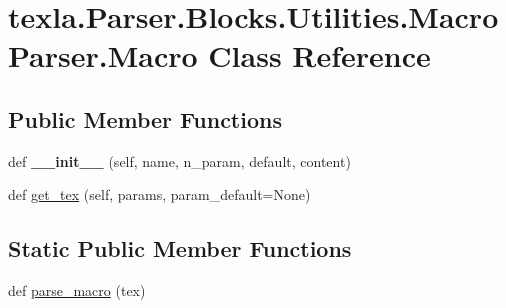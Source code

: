 \hypertarget{classtexla_1_1Parser_1_1Blocks_1_1Utilities_1_1MacroParser_1_1Macro}{}\section{texla.\+Parser.\+Blocks.\+Utilities.\+Macro\+Parser.\+Macro Class Reference}
\label{classtexla_1_1Parser_1_1Blocks_1_1Utilities_1_1MacroParser_1_1Macro}
\subsection*{Public Member Functions}
\begin{DoxyCompactItemize}
\item 
\hypertarget{classtexla_1_1Parser_1_1Blocks_1_1Utilities_1_1MacroParser_1_1Macro_abbe07cf46b4432ce9a65e576718c5bf2}{}\label{classtexla_1_1Parser_1_1Blocks_1_1Utilities_1_1MacroParser_1_1Macro_abbe07cf46b4432ce9a65e576718c5bf2} 
def {\bfseries \+\_\+\+\_\+init\+\_\+\+\_\+} (self, name, n\+\_\+param, default, content)
\item 
def \hyperlink{classtexla_1_1Parser_1_1Blocks_1_1Utilities_1_1MacroParser_1_1Macro_a7f605660a8517687a8b13cfa51637047}{get\+\_\+tex} (self, params, param\+\_\+default=None)
\end{DoxyCompactItemize}
\subsection*{Static Public Member Functions}
\begin{DoxyCompactItemize}
\item 
def \hyperlink{classtexla_1_1Parser_1_1Blocks_1_1Utilities_1_1MacroParser_1_1Macro_a874a31f4bd9da2ccc4f949656b12b23c}{parse\+\_\+macro} (tex)
\end{DoxyCompactItemize}
